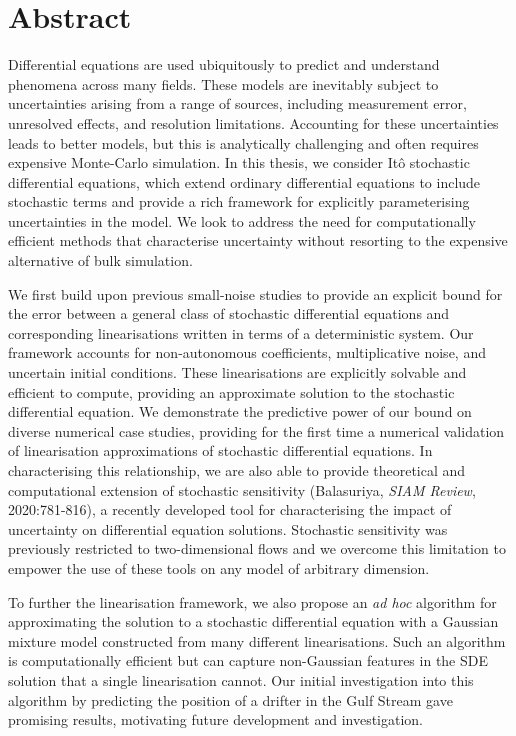 \chapter{Abstract}
\label{ch:abstract}
\small
Differential equations are used ubiquitously to predict and understand phenomena across many fields.
These models are inevitably subject to uncertainties arising from a range of sources, including measurement error, unresolved effects, and resolution limitations.
Accounting for these uncertainties leads to better models, but this is analytically challenging and often requires expensive Monte-Carlo simulation.
In this thesis, we consider It\^o stochastic differential equations, which extend ordinary differential equations to include stochastic terms and provide a rich framework for explicitly parameterising uncertainties in the model.
We look to address the need for computationally efficient methods that characterise uncertainty without resorting to the expensive alternative of bulk simulation.

We first build upon previous small-noise studies to provide an explicit bound for the error between a general class of stochastic differential equations and corresponding linearisations written in terms of a deterministic system.
Our framework accounts for non-autonomous coefficients, multiplicative noise, and uncertain initial conditions.
These linearisations are explicitly solvable and efficient to compute, providing an approximate solution to the stochastic differential equation.
We demonstrate the predictive power of our bound on diverse numerical case studies, providing for the first time a numerical validation of linearisation approximations of stochastic differential equations.
In characterising this relationship, we are also able to provide theoretical and computational extension of stochastic sensitivity (Balasuriya, \emph{SIAM Review}, 2020:781-816), a recently developed tool for characterising the impact of uncertainty on differential equation solutions.
Stochastic sensitivity was previously restricted to two-dimensional flows and we overcome this limitation to empower the use of these tools on any model of arbitrary dimension.

To further the linearisation framework, we also propose an \emph{ad hoc} algorithm for approximating the solution to a stochastic differential equation with a Gaussian mixture model constructed from many different linearisations.
Such an algorithm is computationally efficient but can capture non-Gaussian features in the SDE solution that a single linearisation cannot.
Our initial investigation into this algorithm by predicting the position of a drifter in the Gulf Stream gave promising results, motivating future development and investigation.

